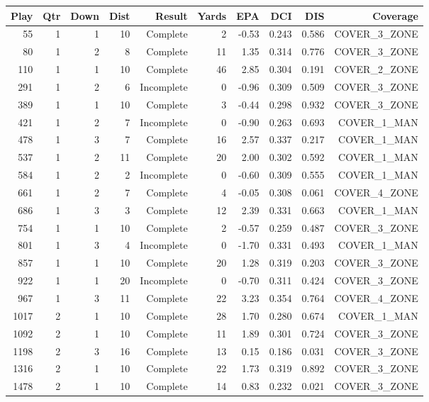 \begin{tabular}{rrrrrrrrrr}
\toprule
Play & Qtr & Down & Dist & Result & Yards & EPA & DCI & DIS & Coverage \\
\midrule
55 & 1 & 1 & 10 & Complete & 2 & -0.53 & 0.243 & 0.586 & COVER\_3\_ZONE \\
80 & 1 & 2 & 8 & Complete & 11 & 1.35 & 0.314 & 0.776 & COVER\_3\_ZONE \\
110 & 1 & 1 & 10 & Complete & 46 & 2.85 & 0.304 & 0.191 & COVER\_2\_ZONE \\
291 & 1 & 2 & 6 & Incomplete & 0 & -0.96 & 0.309 & 0.509 & COVER\_3\_ZONE \\
389 & 1 & 1 & 10 & Complete & 3 & -0.44 & 0.298 & 0.932 & COVER\_3\_ZONE \\
421 & 1 & 2 & 7 & Incomplete & 0 & -0.90 & 0.263 & 0.693 & COVER\_1\_MAN \\
478 & 1 & 3 & 7 & Complete & 16 & 2.57 & 0.337 & 0.217 & COVER\_1\_MAN \\
537 & 1 & 2 & 11 & Complete & 20 & 2.00 & 0.302 & 0.592 & COVER\_1\_MAN \\
584 & 1 & 2 & 2 & Incomplete & 0 & -0.60 & 0.309 & 0.555 & COVER\_1\_MAN \\
661 & 1 & 2 & 7 & Complete & 4 & -0.05 & 0.308 & 0.061 & COVER\_4\_ZONE \\
686 & 1 & 3 & 3 & Complete & 12 & 2.39 & 0.331 & 0.663 & COVER\_1\_MAN \\
754 & 1 & 1 & 10 & Complete & 2 & -0.57 & 0.259 & 0.487 & COVER\_3\_ZONE \\
801 & 1 & 3 & 4 & Incomplete & 0 & -1.70 & 0.331 & 0.493 & COVER\_1\_MAN \\
857 & 1 & 1 & 10 & Complete & 20 & 1.28 & 0.319 & 0.203 & COVER\_3\_ZONE \\
922 & 1 & 1 & 20 & Incomplete & 0 & -0.70 & 0.311 & 0.424 & COVER\_3\_ZONE \\
967 & 1 & 3 & 11 & Complete & 22 & 3.23 & 0.354 & 0.764 & COVER\_4\_ZONE \\
1017 & 2 & 1 & 10 & Complete & 28 & 1.70 & 0.280 & 0.674 & COVER\_1\_MAN \\
1092 & 2 & 1 & 10 & Complete & 11 & 1.89 & 0.301 & 0.724 & COVER\_3\_ZONE \\
1198 & 2 & 3 & 16 & Complete & 13 & 0.15 & 0.186 & 0.031 & COVER\_3\_ZONE \\
1316 & 2 & 1 & 10 & Complete & 22 & 1.73 & 0.319 & 0.892 & COVER\_3\_ZONE \\
1478 & 2 & 1 & 10 & Complete & 14 & 0.83 & 0.232 & 0.021 & COVER\_3\_ZONE \\

\end{tabular}
